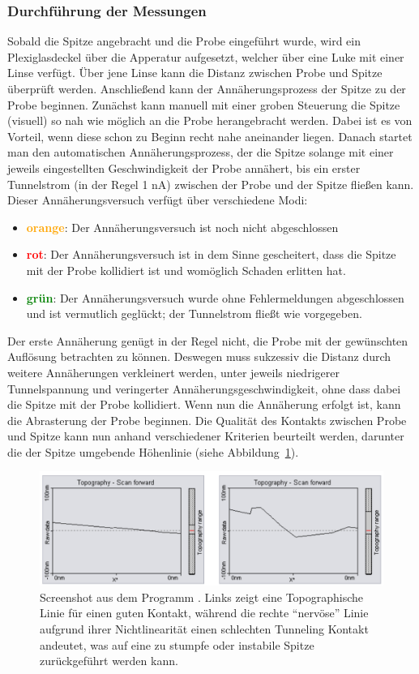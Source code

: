 \subsubsection{Durchführung der Messungen}
Sobald die Spitze angebracht und die Probe eingeführt wurde, 
wird ein Plexiglasdeckel über die Apperatur aufgesetzt, welcher
über eine Luke mit einer Linse verfügt. Über jene Linse kann die
Distanz zwischen Probe und Spitze überprüft werden. Anschließend
kann der Annäherungsprozess der Spitze zu der Probe beginnen. 
Zunächst kann manuell mit einer groben Steuerung die Spitze
(visuell) so nah wie möglich an die Probe herangebracht werden.
Dabei ist es von Vorteil, wenn diese schon zu Beginn recht nahe
aneinander liegen. Danach startet man den automatischen
Annäherungsprozess,
der die Spitze solange mit einer jeweils eingestellten
Geschwindigkeit der Probe annähert, bis ein erster Tunnelstrom
(in der Regel 1 nA)
zwischen der Probe und der Spitze fließen kann.  
Dieser Annäherungsversuch verfügt über verschiedene Modi:
\begin{itemize}
    \item \textbf{\textcolor{orange}{orange}}:
            Der Annäherungsversuch ist noch
            nicht abgeschlossen
    \item \textbf{\textcolor{red}{rot}}: 
            Der Annäherungsversuch ist in dem Sinne
            gescheitert, dass die Spitze mit der Probe kollidiert
            ist und womöglich Schaden erlitten hat. 
    \item \textbf{\textcolor{green}{grün}}: 
            Der Annäherungsversuch
            wurde ohne Fehlermeldungen
            abgeschlossen und ist vermutlich geglückt;
            der Tunnelstrom fließt wie vorgegeben.
\end{itemize}
Der erste Annäherung genügt in der Regel nicht, die Probe
mit der gewünschten Auflösung betrachten zu können. Deswegen muss
sukzessiv die Distanz 
durch weitere Annäherungen verkleinert werden,
unter jeweils niedrigerer
Tunnelspannung und veringerter Annäherungsgeschwindigkeit, 
ohne dass dabei die Spitze mit der Probe kollidiert.
Wenn nun die Annäherung erfolgt ist, kann die Abrasterung
der Probe beginnen. Die Qualität des Kontakts zwischen Probe
und Spitze kann nun anhand verschiedener Kriterien beurteilt werden,
darunter die der Spitze umgebende Höhenlinie (siehe
Abbildung~\ref{fig:topography}).
\begin{figure}
\includegraphics[width=14cm]{pics/Topography}
\caption{Screenshot aus dem Programm \cite{easyscan2_STM}. 
Links zeigt eine 
Topographische Linie für einen guten Kontakt, während die
rechte ``nervöse'' Linie aufgrund ihrer Nichtlinearität
einen schlechten Tunneling Kontakt
andeutet, was auf eine zu stumpfe oder instabile Spitze
zurückgeführt werden kann.}
 \label{fig:topography}
\end{figure}
